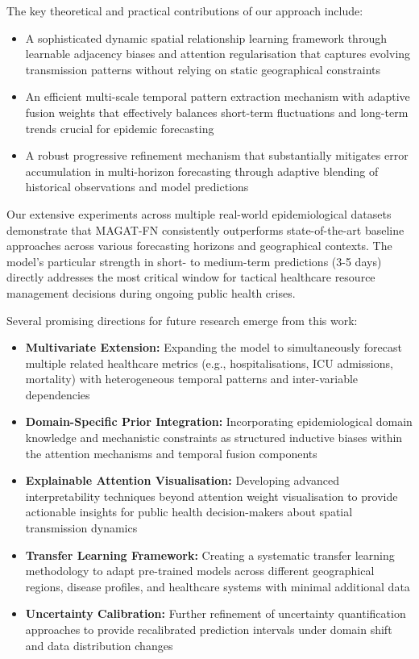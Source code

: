 \documentclass[lettersize, journal]{IEEEtran}
\begin{document}
The key theoretical and practical contributions of our approach include:
\begin{itemize}
    \item A sophisticated dynamic spatial relationship learning framework through learnable adjacency biases and attention regularisation that captures evolving transmission patterns without relying on static geographical constraints
    \item An efficient multi-scale temporal pattern extraction mechanism with adaptive fusion weights that effectively balances short-term fluctuations and long-term trends crucial for epidemic forecasting
    \item A robust progressive refinement mechanism that substantially mitigates error accumulation in multi-horizon forecasting through adaptive blending of historical observations and model predictions
\end{itemize}

Our extensive experiments across multiple real-world epidemiological datasets demonstrate that MAGAT-FN consistently outperforms state-of-the-art baseline approaches across various forecasting horizons and geographical contexts. The model's particular strength in short- to medium-term predictions (3-5 days) directly addresses the most critical window for tactical healthcare resource management decisions during ongoing public health crises.

Several promising directions for future research emerge from this work:
\begin{itemize}
    \item \textbf{Multivariate Extension:} Expanding the model to simultaneously forecast multiple related healthcare metrics (e.g., hospitalisations, ICU admissions, mortality) with heterogeneous temporal patterns and inter-variable dependencies
    \item \textbf{Domain-Specific Prior Integration:} Incorporating epidemiological domain knowledge and mechanistic constraints as structured inductive biases within the attention mechanisms and temporal fusion components
    \item \textbf{Explainable Attention Visualisation:} Developing advanced interpretability techniques beyond attention weight visualisation to provide actionable insights for public health decision-makers about spatial transmission dynamics
    \item \textbf{Transfer Learning Framework:} Creating a systematic transfer learning methodology to adapt pre-trained models across different geographical regions, disease profiles, and healthcare systems with minimal additional data
    \item \textbf{Uncertainty Calibration:} Further refinement of uncertainty quantification approaches to provide recalibrated prediction intervals under domain shift and data distribution changes
\end{itemize}
\end{document}
